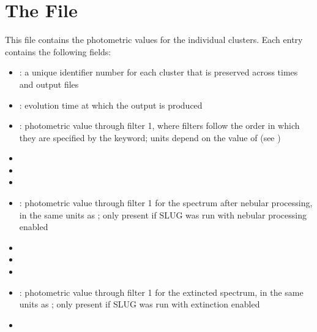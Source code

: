 \documentclass[letterpaper,10pt,english]{sphinxmanual}
\begin{document}
\section{The  File}
\label{\detokenize{output:the-cluster-phot-file}}\label{\detokenize{output:ssec-cluster-phot-file}}
This file contains the photometric values for the individual clusters. Each entry contains the following fields:
\begin{itemize}
\item {} 
: a unique identifier number for each cluster that is preserved across times and output files

\item {} 
: evolution time at which the output is produced

\item {} 
: photometric value through filter 1, where filters follow the order in which they are specified by the  keyword; units depend on the value of  (see {\hyperref[\detokenize{parameters:ssec-phot-keywords}]{}})

\item {} 

\item {} 

\item {} 

\item {} 
: photometric value through filter 1 for the spectrum after nebular processing, in the same units as ; only present if SLUG was run with nebular processing enabled

\item {} 

\item {} 

\item {} 

\item {} 
: photometric value through filter 1 for the extincted spectrum, in the same units as ; only present if SLUG was run with extinction enabled

\item {} 


\end{itemize}
\end{document}
